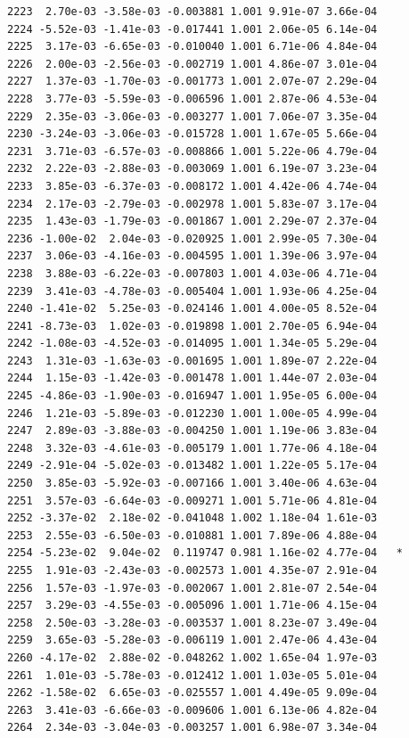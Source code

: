 \documentclass[
  letterpaper,
  DIV=11,
  numbers=noendperiod]{scrartcl}
\begin{document}
\begin{verbatim}
2223  2.70e-03 -3.58e-03 -0.003881 1.001 9.91e-07 3.66e-04    
2224 -5.52e-03 -1.41e-03 -0.017441 1.001 2.06e-05 6.14e-04    
2225  3.17e-03 -6.65e-03 -0.010040 1.001 6.71e-06 4.84e-04    
2226  2.00e-03 -2.56e-03 -0.002719 1.001 4.86e-07 3.01e-04    
2227  1.37e-03 -1.70e-03 -0.001773 1.001 2.07e-07 2.29e-04    
2228  3.77e-03 -5.59e-03 -0.006596 1.001 2.87e-06 4.53e-04    
2229  2.35e-03 -3.06e-03 -0.003277 1.001 7.06e-07 3.35e-04    
2230 -3.24e-03 -3.06e-03 -0.015728 1.001 1.67e-05 5.66e-04    
2231  3.71e-03 -6.57e-03 -0.008866 1.001 5.22e-06 4.79e-04    
2232  2.22e-03 -2.88e-03 -0.003069 1.001 6.19e-07 3.23e-04    
2233  3.85e-03 -6.37e-03 -0.008172 1.001 4.42e-06 4.74e-04    
2234  2.17e-03 -2.79e-03 -0.002978 1.001 5.83e-07 3.17e-04    
2235  1.43e-03 -1.79e-03 -0.001867 1.001 2.29e-07 2.37e-04    
2236 -1.00e-02  2.04e-03 -0.020925 1.001 2.99e-05 7.30e-04    
2237  3.06e-03 -4.16e-03 -0.004595 1.001 1.39e-06 3.97e-04    
2238  3.88e-03 -6.22e-03 -0.007803 1.001 4.03e-06 4.71e-04    
2239  3.41e-03 -4.78e-03 -0.005404 1.001 1.93e-06 4.25e-04    
2240 -1.41e-02  5.25e-03 -0.024146 1.001 4.00e-05 8.52e-04    
2241 -8.73e-03  1.02e-03 -0.019898 1.001 2.70e-05 6.94e-04    
2242 -1.08e-03 -4.52e-03 -0.014095 1.001 1.34e-05 5.29e-04    
2243  1.31e-03 -1.63e-03 -0.001695 1.001 1.89e-07 2.22e-04    
2244  1.15e-03 -1.42e-03 -0.001478 1.001 1.44e-07 2.03e-04    
2245 -4.86e-03 -1.90e-03 -0.016947 1.001 1.95e-05 6.00e-04    
2246  1.21e-03 -5.89e-03 -0.012230 1.001 1.00e-05 4.99e-04    
2247  2.89e-03 -3.88e-03 -0.004250 1.001 1.19e-06 3.83e-04    
2248  3.32e-03 -4.61e-03 -0.005179 1.001 1.77e-06 4.18e-04    
2249 -2.91e-04 -5.02e-03 -0.013482 1.001 1.22e-05 5.17e-04    
2250  3.85e-03 -5.92e-03 -0.007166 1.001 3.40e-06 4.63e-04    
2251  3.57e-03 -6.64e-03 -0.009271 1.001 5.71e-06 4.81e-04    
2252 -3.37e-02  2.18e-02 -0.041048 1.002 1.18e-04 1.61e-03    
2253  2.55e-03 -6.50e-03 -0.010881 1.001 7.89e-06 4.88e-04    
2254 -5.23e-02  9.04e-02  0.119747 0.981 1.16e-02 4.77e-04   *
2255  1.91e-03 -2.43e-03 -0.002573 1.001 4.35e-07 2.91e-04    
2256  1.57e-03 -1.97e-03 -0.002067 1.001 2.81e-07 2.54e-04    
2257  3.29e-03 -4.55e-03 -0.005096 1.001 1.71e-06 4.15e-04    
2258  2.50e-03 -3.28e-03 -0.003537 1.001 8.23e-07 3.49e-04    
2259  3.65e-03 -5.28e-03 -0.006119 1.001 2.47e-06 4.43e-04    
2260 -4.17e-02  2.88e-02 -0.048262 1.002 1.65e-04 1.97e-03    
2261  1.01e-03 -5.78e-03 -0.012412 1.001 1.03e-05 5.01e-04    
2262 -1.58e-02  6.65e-03 -0.025557 1.001 4.49e-05 9.09e-04    
2263  3.41e-03 -6.66e-03 -0.009606 1.001 6.13e-06 4.82e-04    
2264  2.34e-03 -3.04e-03 -0.003257 1.001 6.98e-07 3.34e-04    

\end{verbatim}
\end{document}
